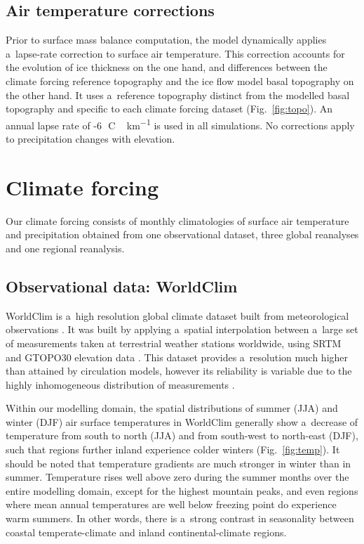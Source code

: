 \documentclass[tc, ms]{copernicus}
\begin{document}
\subsection{Air temperature corrections}

Prior to surface mass balance computation, the model dynamically applies a~lapse-rate correction to surface air temperature. This correction accounts for the evolution of ice thickness on the one hand, and differences between the climate forcing reference topography and the ice flow model basal topography on the other hand. It uses a~reference topography distinct from the modelled basal topography and specific to each climate forcing dataset (Fig.~\ref{fig:topo}). An annual lapse rate of -6\,\unit{{\degree}C\,km^{-1}} is used in all simulations. No corrections apply to precipitation changes with elevation.

\section{Climate forcing}
\label{sec:climate}

Our climate forcing consists of monthly climatologies of surface air temperature and precipitation obtained from one observational dataset, three global reanalyses and one regional reanalysis.

\subsection{Observational data: WorldClim}

WorldClim is a~high resolution global climate dataset built from meteorological observations \citep{data:worldclim}. It was built by applying a~spatial interpolation between a~large set of measurements taken at terrestrial weather stations worldwide, using SRTM \citep{data:srtm} and GTOPO30 elevation data \citep{data:gtopo30}. This dataset provides a~resolution much higher than attained by circulation models, however its reliability is variable due to the highly inhomogeneous distribution of measurements \citep{data:worldclim}.

Within our modelling domain, the spatial distributions of summer (JJA) and winter (DJF) air surface temperatures in WorldClim generally show a~decrease of temperature from south to north (JJA) and from south-west to north-east (DJF), such that regions further inland experience colder winters (Fig.~\ref{fig:temp}). It should be noted that temperature gradients are much stronger in winter than in summer. Temperature rises well above zero during the summer months over the entire modelling domain, except for the highest mountain peaks, and even regions where mean annual temperatures are well below freezing point do experience warm summers. In other words, there is a~strong contrast in seasonality between coastal temperate-climate and inland continental-climate regions.
\end{document}
